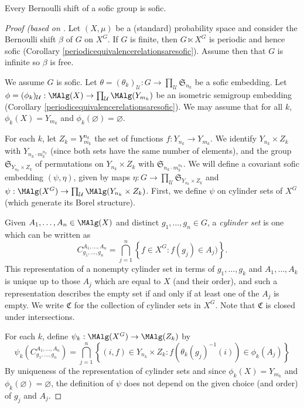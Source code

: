 \begin{proposition}
Every Bernoulli shift of a sofic group is sofic.
\end{proposition}
\begin{proof}[Proof (based on \cite{ozawasoficnotes}]
Let $(X,\mu)$ be a (standard) probability space and consider the Bernoulli shift $\beta$ of $G$ on $X^G$. If $G$ is finite, then $G\ltimes X^G$ is periodic and hence sofic (Corollary \ref{periodicequivalencerelationsaresofic}). Assume then that $G$ is infinite so $\beta$ is free.

We assume $G$ is sofic. Let $\theta=(\theta_k)_\mathcal{U}:G\to\prod_\mathcal{U}\mathfrak{S}_{n_k}$ be a sofic embedding. Let $\phi=(\phi_k)_\mathcal{U}:\MAlg(X)\to\prod_\mathcal{U}\MAlg(Y_{m_k})$ be an isometric semigroup embedding (Corollary \ref{periodicequivalencerelationsaresofic}). We may assume that for all $k$, $\phi_k(X)=Y_{m_k}$ and $\phi_k(\varnothing)=\varnothing$.

For each $k$, let $Z_k=Y_{m_k}^{n_k}$ the set of functions $f:Y_{n_k}\to Y_{m_k}$. We identify $Y_{n_k}\times Z_k$ with $Y_{n_k\cdot m_k^{n_k}}$ (since both sets have the same number of elements), and the group $\mathfrak{S}_{Y_{n_k}\times Z_k}$ of permutations on $Y_{n_k}\times Z_k$ with $\mathfrak{S}_{n_k\cdot m_k^{n_k}}$. We will define a covariant sofic embedding $(\psi,\eta)$, given by maps $\eta:G\to\prod_\mathcal{U}\mathfrak{S}_{Y_{n_k}\times Z_k}$ and $\psi:\MAlg(X^G)\to\prod_\mathcal{U}\MAlg(Y_{n_k}\times Z_k)$. First, we define $\psi$ on cylinder sets of $X^G$ (which generate its Borel structure).

Given $A_1,\ldots,A_n\in\MAlg(X)$ and distinct $g_1,\ldots,g_n\in G$, a \emph{cylinder set} is one which can be written as
\[C_{g_1,\ldots,g_n}^{A_1,\ldots,A_n}=\bigcap_{j=1}^n\left\{f\in X^G: f(g_j)\in A_j)\right\}.\]
This representation of a nonempty cylinder set in terms of $g_1,\ldots,g_k$ and $A_1,\ldots,A_k$ is unique up to those $A_j$ which are equal to $X$ (and their order), and such a representation describes the empty set if and only if at least one of the $A_j$ is empty. We write $\mathfrak{C}$ for the collection of cylinder sets in $X^G$. Note that $\mathfrak{C}$ is closed under intersections.

For each $k$, define $\psi_k:\MAlg(X^G)\to\MAlg(Z_k)$ by
\[\psi_k(C_{g_1,\ldots,g_n}^{A_1,\ldots,A_n})=\bigcap_{j=1}^n\left\{(i,f)\in Y_{n_k}\times Z_k:f\left(\theta_k(g_j)^{-1}(i)\right)\in\phi_k(A_j)\right\}\]
By uniqueness of the representation of cylinder sets and since $\phi_k(X)= Y_{m_k}$ and $\phi_k(\varnothing)=\varnothing$, the definition of $\psi$ does not depend on the given choice (and order) of $g_j$ and $A_j$.


\end{proof}
